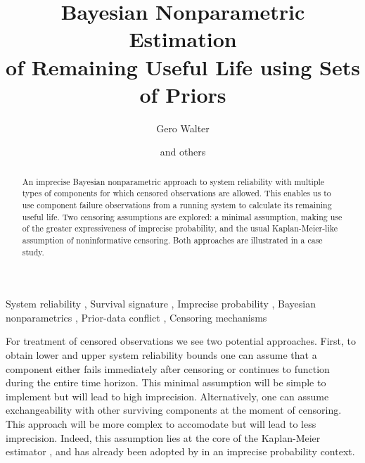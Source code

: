 \documentclass[12pt, a4paper]{elsarticle}
\begin{document}
\begin{frontmatter}
\title{Bayesian Nonparametric Estimation\\ of Remaining Useful Life using Sets of Priors}

\author[ein]{Gero Walter}
\author{and others}

\address[ein]{School of Industrial Engineering, Eindhoven University of Technology, Eindhoven, NL}

\begin{abstract}
An imprecise Bayesian nonparametric approach
to system reliability with multiple types of components
for which censored observations are allowed.
This enables us to use component failure observations from a running system
to calculate its remaining useful life.
Two censoring assumptions are explored:
a minimal assumption, making use of the greater expressiveness of imprecise probability,
and the usual Kaplan-Meier-like assumption of noninformative censoring.
Both approaches are illustrated in a case study.
\end{abstract}

\begin{keyword}
System reliability \sep
Survival signature \sep
Imprecise probability \sep
Bayesian nonparametrics \sep
Prior-data conflict \sep
Censoring mechanisms
\end{keyword}
\end{frontmatter}



For treatment of censored observations
we see two potential approaches.
First, to obtain lower and upper system reliability bounds 
one can assume that a component either fails immediately after censoring or
continues to function during the entire time horizon.
This minimal assumption will be simple to implement but will lead to high imprecision.
Alternatively, one can assume exchangeability with other surviving components at the moment of censoring.
This approach will be more complex to accomodate but will lead to less imprecision.
Indeed, this assumption lies at the core of the Kaplan-Meier estimator \citep{1958:kaplan-meier},
and has already been adopted by \citet{2004:coolen-yan} in an imprecise probability context.\\
\end{document}
